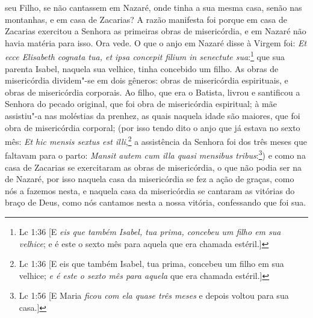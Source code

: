 seu Filho, se não cantassem em Nazaré, onde tinha a sua mesma casa,
senão nas montanhas, e em casa de Zacarias? A razão manifesta foi porque
em casa de Zacarias exercitou a Senhora as primeiras obras de
misericórdia, e em Nazaré não havia matéria para isso. Ora vede. O que o
anjo em Nazaré disse à Virgem foi: \emph{Et ecce Elisabeth cognata tua,
et ipsa concepit filium in senectute sua}:\footnote{Lc 1:36 [E \textit{eis que também Isabel, tua prima, concebeu um filho em sua velhice}; e é este o sexto mês para aquela que era chamada estéril.]} que sua parenta
Isabel, naquela sua
velhice, tinha concebido um filho. As obras de misericórdia dividem"-se
em dois gêneros: obras de misericórdia espirituais, e obras de
misericórdia corporais. Ao filho, que era o Batista, livrou e santificou
a Senhora do pecado original, que foi obra de misericórdia espiritual; à
mãe assistiu"-a nas moléstias da prenhez, as quais naquela idade são
maiores, que foi obra de misericórdia corporal; (por isso tendo dito o
anjo que já estava no sexto mês: \emph{Et hic mensis sextus est illi},\footnote{Lc 1:36 [E eis que também Isabel, tua prima, concebeu um filho em sua velhice; \textit{e é este o sexto mês para aquela} que era chamada estéril.]}
a assistência da Senhora foi dos três meses que faltavam
para o parto: \emph{Mansit autem cum illa quasi mensibus tribus}:\footnote{Lc 1:56 [E Maria \textit{ficou com ela quase três meses} e depois voltou para sua casa.]}) e como na casa de Zacarias se exercitaram as obras de misericórdia, o
que não podia ser na de Nazaré, por isso naquela casa da misericórdia se
fez a ação de graças, como nós a fazemos nesta, e naquela casa da
misericórdia se cantaram as vitórias do braço de Deus, como nós cantamos
nesta a nossa vitória, confessando que foi sua.

